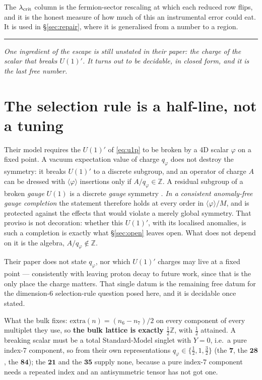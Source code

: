 \documentclass[11pt,a4paper]{article}
\newcommand{\ZZ}{\mathbb{Z}}
\newcommand{\rep}[1]{\mathbf{#1}}
\newcommand{\bridge}[1]{\par\medskip\noindent
  \textcolor{hdrblue!45}{\rule{2.2cm}{0.6pt}}\;\;\parbox[t]{0.84\textwidth}{\small\itshape
  \textcolor{hdrblue!85}{#1}}\par\medskip}
\begin{document}
The $\lambda_{\rm crit}$ column is the fermion-sector rescaling at which each reduced row flips, and
it is the honest measure of how much of this an instrumental error could eat. It is used in
\S\ref{sec:repair}, where it is generalised from a number to a region.

\bridge{One ingredient of the escape is still unstated in their paper: the charge of the scalar that
breaks $U(1)'$. It turns out to be decidable, in closed form, and it is the last free number.}

\section{The selection rule is a half-line, not a tuning}\label{sec:qphi}

Their model requires the $U(1)'$ of \eqref{eq:u1p} to be broken by a 4D scalar $\varphi$ on a fixed
point. A vacuum
expectation value of charge $q_\varphi$ does not destroy the symmetry: it breaks $U(1)'$ to a
discrete subgroup, and an operator of charge $A$ can be dressed with $\langle\varphi\rangle$
insertions only if $A/q_\varphi\in\ZZ$. A residual subgroup of a broken \emph{gauge} $U(1)$ is a
discrete \emph{gauge} symmetry \cite{KW,IR}. \emph{In a consistent anomaly-free gauge completion}
the statement therefore holds at every order in $\langle\varphi\rangle/M$, and is protected against
the effects that would violate a merely global symmetry. That proviso is not decoration: whether
this $U(1)'$, with its localised anomalies, is such a completion is exactly what
\S\ref{sec:open} leaves open. What does not depend on it is the algebra,
$A/q_\varphi\notin\ZZ$.

Their paper does not state $q_\varphi$, nor which $U(1)'$ charges may live at a fixed point ---
consistently with leaving proton decay to future work, since that is the only place the charge
matters. That single datum is the remaining free datum for the dimension-6 selection-rule question
posed here, and it is decidable once stated.

What the bulk fixes: $\mathrm{extra}(n)=(n_6-n_7)/2$ on every component of every multiplet they use,
so \textbf{the bulk lattice is exactly $\tfrac12\ZZ$}, with $\tfrac12$ attained. A breaking scalar
must be a total Standard-Model singlet with $Y=0$, i.e.\ a pure index-7 component, so from their own
representations $q_\varphi\in\{\tfrac12,1,\tfrac32\}$ (the $\rep7$, the $\rep{28}$, the $\rep{84}$);
the $\rep{21}$ and the $\rep{35}$ supply none, because a pure index-7 component needs a repeated
index and an antisymmetric tensor has not got one.
\end{document}
